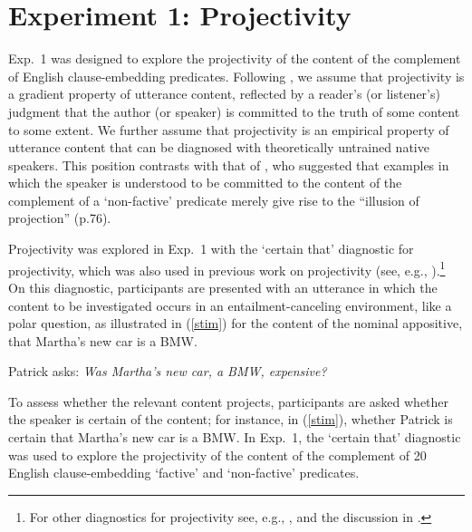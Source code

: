 \documentclass[11pt,fleqn]{article}
\newcommand{\6}{\mbox{$[\hspace*{-.6mm}[$}}
\newcommand{\9}{\mbox{$]\hspace*{-.6mm}]$}}
\begin{document}


\section{Experiment 1: Projectivity}\label{s2}

Exp.~1 was designed to explore the projectivity of the content of the complement of English clause-embedding predicates. Following \citealt{tbd-variability}, we assume that projectivity is a gradient property of utterance content, reflected by a reader's (or listener's) judgment that the author (or speaker) is committed to the truth of some content to some extent.  We further assume that projectivity is an empirical property of utterance content that can be diagnosed with theoretically untrained native speakers. This position contrasts with that of \citet{anand-hacquard2014}, who suggested that examples in which the speaker is understood to be committed to the content of the complement of a `non-factive' predicate merely give rise to the ``illusion of projection'' (p.76). 

Projectivity was explored in Exp.~1 with the `certain that' diagnostic for projectivity, which was also used in previous work on projectivity (see, e.g., \citealt{tonhauser-salt26,djaerv-bacovcin-salt27,stevens-etal2017,tbd-variability}).\footnote{For other diagnostics for projectivity see, e.g., \citealt{smith-hall11,xue-onea11,brst-lang11}, and the discussion in \citealt{tbd-variability}.} On this diagnostic, participants are presented with an utterance in which the content to be investigated occurs in an entailment-canceling environment, like a polar question, as illustrated in (\ref{stim}) for the content of the nominal appositive, that Martha's new car is a BMW.

\begin{exe}

\ex\label{stim} Patrick asks: {\em Was Martha's new car, a BMW, expensive?} 

\end{exe}
To assess whether the relevant content projects, participants are asked whether the speaker is certain of the content; for instance, in (\ref{stim}), whether Patrick is certain that Martha's new car is a BMW. In Exp.~1, the `certain that' diagnostic was used to explore the projectivity of the content of the complement of 20 English clause-embedding `factive' and `non-factive' predicates. 
\end{document}
